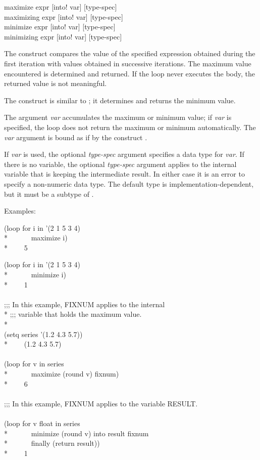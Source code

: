 \begin{defloop}
maximize expr [\!into! var] [type-spec] \\
maximizing expr [\!into! var] [type-spec] \\
minimize expr [\!into! var] [type-spec] \\
minimizing expr [\!into! var] [type-spec]

The  construct compares the value of the specified expression
obtained during the first iteration with values obtained in successive
iterations. The maximum value encountered is determined and returned.  If the
loop never executes the body, the returned value is not meaningful.

The  construct is similar to ; it
determines and returns the minimum value.

The argument {\it var\/} accumulates the maximum or
minimum value; if {\it var} is specified, the loop
does not return the maximum or minimum automatically.  The {\it var\/} argument
is bound as if by the construct .

If  {\it var\/} is used, the optional
{\it type-spec\/} argument specifies a data type for {\it var\/}.
If there is no  variable, the optional {\it type-spec\/}
argument applies to the internal variable that is keeping the intermediate result.
In either case it is an error to specify a non-numeric 
data type.
The default type is implementation-dependent, but it must be a subtype
of .

Examples:
\begin{lisp}
(loop for i in '(2 1 5 3 4) \\*
~~~~~~maximize i) \\*
~~~\EV~5
\end{lisp}
\begin{lisp}
(loop for i in '(2 1 5 3 4) \\*
~~~~~~minimize i) \\*
~~~\EV~1 \\
 \\
;;; In this example, FIXNUM applies to the internal \\*
;;; variable that holds the maximum value. \\*
\\
(setq series '(1.2 4.3 5.7)) \\*
~~~\EV~(1.2 4.3 5.7) \\
\\
(loop for v in series  \\*
~~~~~~maximize (round v) fixnum) \\*
~~~\EV~6 \\
 \\
;;; In this example, FIXNUM applies to the variable RESULT. \\
\\
(loop for v float in series \\*
~~~~~~minimize (round v) into result fixnum \\*
~~~~~~finally (return result)) \\*
~~~\EV~1
\end{lisp}
\end{defloop}



